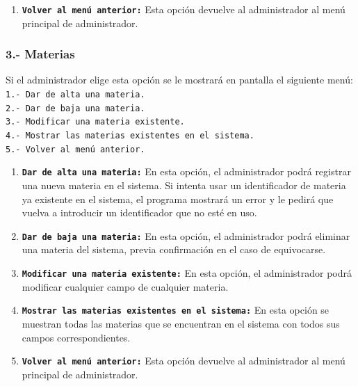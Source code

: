 \documentclass{book}
\begin{document}
{\begin{enumerate}
	\begin{enumerate}
		\item \textbf{\texttt{1.- Matricular un alumno de una nueva asignatura:}} Si se selecciona esta opción, el administrador podrá añadir una nueva matricula de un alumno a una asignatura en la que no se encuentre matriculado.
		\item \textbf{\texttt{2.- Eliminar matrícula de una asignatura de un alumno:}} En esta opción se elimina una matrícula de un alumno en la asignatura que se seleccione.
		\item \textbf{\texttt{3.- Realizar cambios en una matrícula existente de un alumno:}} En esta opción se podrá modificar cualquier campo de la matrícula de un alumno.
		\item \textbf{\texttt{4.- Mostrar la matrícula de un alumno:}} En esta opción el administrador podrá listar las matrículas de un alumno.
		\item \textbf{\texttt{5.- Volver al menú anterior:}} Esta opción devuelve al administrador al menú de la gestión de alumnos.
	\end{enumerate}
	\item \textbf{\texttt{Volver al menú anterior:}} Esta opción devuelve al administrador al menú principal de administrador.
\end{enumerate}
}
\subsubsection{3.- Materias}{
Si el administrador elige esta opción se le mostrará en pantalla el siguiente menú:\\
\texttt{1.- Dar de alta una materia.}\\
\texttt{2.- Dar de baja una materia.}\\
\texttt{3.- Modificar una materia existente.}\\
\texttt{4.- Mostrar las materias existentes en el sistema.}\\
\texttt{5.- Volver al menú anterior.}
\begin{enumerate}
	\item \textbf{\texttt{Dar de alta una materia:}} En esta opción, el administrador podrá registrar una nueva materia en el sistema. Si intenta usar un identificador de materia ya existente en el sistema, el programa mostrará un error y le pedirá que vuelva a introducir un identificador que no esté en uso.
	\item \textbf{\texttt{Dar de baja una materia:}} En esta opción, el administrador podrá eliminar una materia del sistema, previa confirmación en el caso de equivocarse.
	\item \textbf{\texttt{Modificar una materia existente:}} En esta opción, el administrador podrá modificar cualquier campo de cualquier materia.
	\item \textbf{\texttt{Mostrar las materias existentes en el sistema:}} En esta opción se muestran todas las materias que se encuentran en el sistema con todos sus campos correspondientes.
	\item \textbf{\texttt{Volver al menú anterior:}} Esta opción devuelve al administrador al menú principal de administrador.
\end{enumerate}
}
\end{document}
